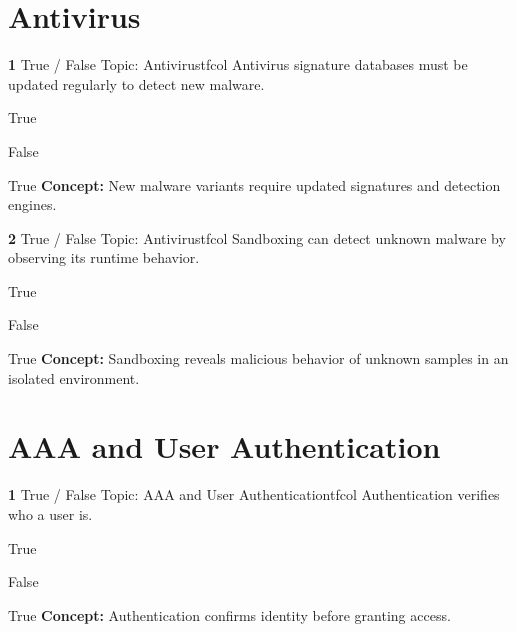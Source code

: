 \documentclass[10pt,a4paper]{article}
\begin{document}
\section{Antivirus}
\begin{qcard}{\color{white}\textbf{1} \hfill \small True / False \textbar{} Topic: Antivirus}{tfcol}
Antivirus signature databases must be updated regularly to detect new malware.

\begin{qoptions}
\item True
\item False
\end{qoptions}
\begin{explainbox}{True}
\textbf{Concept:} New malware variants require updated signatures and detection engines.
\end{explainbox}
\end{qcard}

\begin{qcard}{\color{white}\textbf{2} \hfill \small True / False \textbar{} Topic: Antivirus}{tfcol}
Sandboxing can detect unknown malware by observing its runtime behavior.

\begin{qoptions}
\item True
\item False
\end{qoptions}
\begin{explainbox}{True}
\textbf{Concept:} Sandboxing reveals malicious behavior of unknown samples in an isolated environment.
\end{explainbox}
\end{qcard}

\section{AAA and User Authentication}
\begin{qcard}{\color{white}\textbf{1} \hfill \small True / False \textbar{} Topic: AAA and User Authentication}{tfcol}
Authentication verifies who a user is.

\begin{qoptions}
\item True
\item False
\end{qoptions}
\begin{explainbox}{True}
\textbf{Concept:} Authentication confirms identity before granting access.
\end{explainbox}
\end{qcard}
\end{document}
